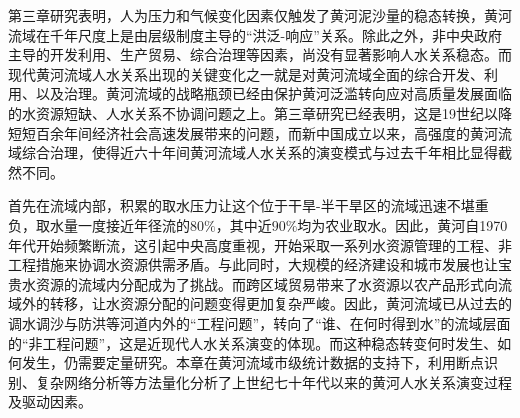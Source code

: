 第三章研究表明，人为压力和气候变化因素仅触发了黄河泥沙量的稳态转换，黄河流域在千年尺度上是由层级制度主导的“洪泛-响应”关系。除此之外，非中央政府主导的开发利用、生产贸易、综合治理等因素，尚没有显著影响人水关系稳态。而现代黄河流域人水关系出现的关键变化之一就是对黄河流域全面的综合开发、利用、以及治理。黄河流域的战略瓶颈已经由保护黄河泛滥转向应对高质量发展面临的水资源短缺、人水关系不协调问题之上。第三章研究已经表明，这是19世纪以降短短百余年间经济社会高速发展带来的问题，而新中国成立以来，高强度的黄河流域综合治理，使得近六十年间黄河流域人水关系的演变模式与过去千年相比显得截然不同。

首先在流域内部，积累的取水压力让这个位于干旱-半干旱区的流域迅速不堪重负，取水量一度接近年径流的$80\%$，其中近$90\%$均为农业取水。因此，黄河自1970年代开始频繁断流，这引起中央高度重视，开始采取一系列水资源管理的工程、非工程措施来协调水资源供需矛盾。与此同时，大规模的经济建设和城市发展也让宝贵水资源的流域内分配成为了挑战。而跨区域贸易带来了水资源以农产品形式向流域外的转移，让水资源分配的问题变得更加复杂严峻。因此，黄河流域已从过去的调水调沙与防洪等河道内外的“工程问题”，转向了“谁、在何时得到水”的流域层面的“非工程问题”，这是近现代人水关系演变的体现。而这种稳态转变何时发生、如何发生，仍需要定量研究。本章在黄河流域市级统计数据的支持下，利用断点识别、复杂网络分析等方法量化分析了上世纪七十年代以来的黄河人水关系演变过程及驱动因素。
